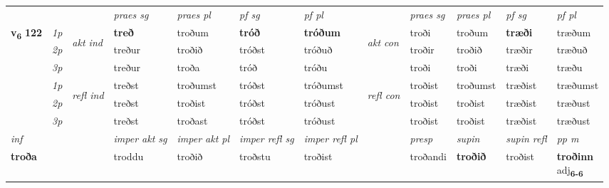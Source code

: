 \begin{longtable}[l]{X>{\footnotesize\itshape}llXXXXlXXXX}
 & &   & \textit{praes sg}  & \textit{praes pl}    & \textit{ pf sg} & \textit{pf pl} & & \textit{praes sg}  & \textit{praes pl}    & \textit{pf sg} & \textit{pf pl }  \\ \cmidrule{4-7} \cmidrule{9-12}
 \multirow{2}{*}{{{\textbf{v{\textsubscript{6}}} \Large{\textbf{122}}}}}  & 1p & \multirow{3}{*}{\begin{turn}{90}\textit{akt ind}\end{turn}} & \textbf{treð} & troðum & \textbf{tróð} & \textbf{tróðum} & \multirow{3}{*}{\begin{turn}{90}\textit{akt con}\end{turn}} &troði & troðum & \textbf{træði} & træðum\\*
 & 2p &  &  treður  & troðið & tróðst & tróðuð & & troðir & troðið & træðir & træðuð \\*
 & 3p &  & treður & troða & tróð & tróðu & & troði & troði& træði & træðu \\*
\cmidrule{4-7} \cmidrule{9-12}
 & 1p & \multirow{3}{*}{\begin{turn}{90}\textit{refl ind}\end{turn}}  & treðst & troðumst & tróðst & tróðumst & \multirow{3}{*}{\begin{turn}{90}\textit{refl con}\end{turn}}  &troðist & troðumst & træðist & træðumst \\*
 & 2p &  & treðst & troðist & tróðst & tróðust & &troðist & troðist & træðist & træðust \\*
 & 3p  & & treðst & troðast & tróðst & tróðust & & troðist & troðist& træðist & træðust \\*
\cmidrule{4-7} \cmidrule{9-12}

   {\textit{inf}} & &  & \textit{imper akt sg} & \textit{imper akt pl} & \textit{imper refl sg} & \textit{imper refl pl} && \textit{presp} & \textit{supin} & \textit{supin refl} & \textit{pp m} \\*
  {\textbf{troða}} & && troddu  & troðið & troðstu & troðist && troðandi &  \textbf{troðið} & troðist & \specialcell{\textbf{troðinn} \\ adj\textbf{\textsubscript{6-6}}} \\*

\midrule


\end{longtable}
